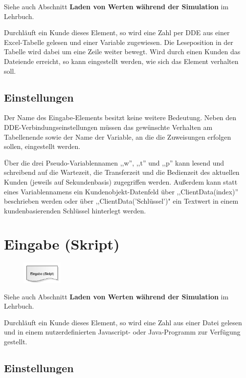 Siehe auch Abschnitt \textbf{Laden von Werten während der Simulation} im Lehrbuch.

Durchläuft ein Kunde dieses Element, so wird eine Zahl per DDE aus einer Excel-Tabelle gelesen und einer
Variable zugewiesen. Die Leseposition in der Tabelle wird dabei um eine Zeile weiter bewegt.
Wird durch einen Kunden das Dateiende erreicht, so kann eingestellt werden, wie sich
das Element verhalten soll.

\subsection*{Einstellungen}

Der Name des Eingabe-Elements besitzt keine weitere Bedeutung. Neben den DDE-Verbindungseinstellungen
müssen das gewünschte Verhalten am Tabellenende
sowie der Name der Variable, an die die Zuweisungen erfolgen sollen, eingestellt werden.

Über die drei Pseudo-Variablennamen ,,w'', ,,t'' und ,,p'' kann lesend und schreibend auf die Wartezeit, die Transferzeit
und die Bedienzeit des aktuellen Kunden (jeweils auf Sekundenbasis) zugegriffen werden. Außerdem kann statt eines
Variablennamens ein Kundenobjekt-Datenfeld über ,,ClientData(index)'' beschrieben werden oder über ,,ClientData('Schlüssel')"
ein Textwert in einem kundenbasierenden Schlüssel hinterlegt werden.


\section{Eingabe (Skript)}
\label{ref:ModelElementInputJS}

\begin{figure}
\vspace{-22pt}
\includegraphics[width=2cm]{imageModelElementInputJS.png}
\vspace{-22pt}
\end{figure}

Siehe auch Abschnitt \textbf{Laden von Werten während der Simulation} im Lehrbuch.

Durchläuft ein Kunde dieses Element, so wird eine Zahl aus einer Datei gelesen und in
einem nutzerdefinierten Javascript- oder Java-Programm zur Verfügung gestellt. 

\subsection*{Einstellungen}

